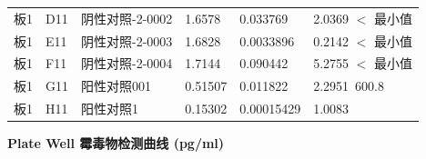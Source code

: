 \documentclass[UTF8,10pt,a4paper,fontset=fandol]{ctexart}
\begin{document}
\begin{minipage}{0.50\linewidth}
\small
\begin{tabular}{@{}llllll@{}}
板1 & D11 & 阴性对照-2-0002 & 1.6578 & 0.033769 & 2.0369 \quad $<$ 最小值\\
板1 & E11 & 阴性对照-2-0003 & 1.6828 & 0.0033896 & 0.2142 \quad $<$ 最小值\\
板1 & F11 & 阴性对照-2-0004 & 1.7144 & 0.090442 & 5.2755 \quad $<$ 最小值\\
板1 & G11 & 阳性对照001 & 0.51507 & 0.011822 & 2.2951 \quad 1\,600.8\\
板1 & H11 & 阳性对照1 & 0.15302 & 0.00015429 & 1.0083\\
\end{tabular}

\vspace{0.5em}

\textbf{Plate Well \quad 霉毒物检测曲线 (pg/ml)}


\end{minipage}
\end{document}
